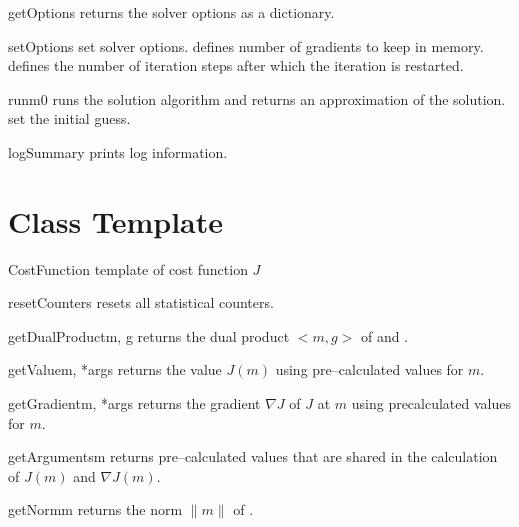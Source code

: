 \begin{methoddesc}[MinimizerLBFGS]{getOptions}{}
returns the solver options as a dictionary.
\end{methoddesc}

\begin{methoddesc}[MinimizerLBFGS]{setOptions}{ }
set solver options.  defines number of gradients to keep in memory.
 defines the number of iteration steps after which the iteration is restarted.
\end{methoddesc}

\begin{methoddesc}[MinimizerLBFGS]{run}{m0}
runs the solution algorithm and returns an approximation of the solution.
 set the initial guess.
\end{methoddesc}

\begin{methoddesc}[MinimizerLBFGS]{logSummary}{}
prints log information.
\end{methoddesc}

\section{ Class Template}\label{chapter:ref:Minimization: costfunction class}

\begin{classdesc}{CostFunction}{}
template of cost function $J$
\end{classdesc}

\begin{methoddesc}[CostFunction]{resetCounters}{}
    resets all statistical counters.
\end{methoddesc}
%
\begin{methoddesc}[CostFunction]{getDualProduct}{m, g}
    returns the dual product $<m,g>$ of  and .
\end{methoddesc}
%
\begin{methoddesc}[CostFunction]{getValue}{m, *args}
    returns the value $J(m)$ using pre--calculated values  for $m$.
\end{methoddesc}
%
\begin{methoddesc}[CostFunction]{getGradient}{m, *args}
    returns the gradient $\nabla J$ of $J$ at $m$ using precalculated values   for $m$.
\end{methoddesc}
%
\begin{methoddesc}[CostFunction]{getArguments}{m}
    returns pre--calculated values that are shared in the calculation of $J(m)$
    and $\nabla J(m)$.
\end{methoddesc}
\begin{methoddesc}[CostFunction]{getNorm}{m}
returns the norm $\|m\|$ of .
\end{methoddesc}


